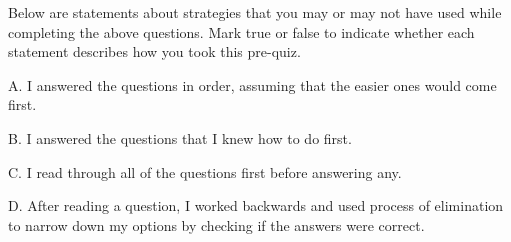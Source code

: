 \documentclass{ximera}
\begin{document}
\begin{question}

Below are statements about strategies that you may or may not have used while completing the above questions.  Mark true or false to indicate whether each statement describes how you took this pre-quiz. 

\begin{question}

    A. I answered the questions in order, assuming that the easier ones would come first.

    \begin{multipleChoice}
    \end{multipleChoice}
    
\end{question}
\begin{question}
    
    B. I answered the questions that I knew how to do first.

    \begin{multipleChoice}
    \end{multipleChoice}
    
\end{question}
\begin{question}
    
    C. I read through all of the questions first before answering any.

    \begin{multipleChoice}
    \end{multipleChoice}
    
\end{question}
\begin{question}
    
    D. After reading a question, I worked backwards and used process of elimination to narrow down my options by checking if the answers were correct.

    \begin{multipleChoice}
    \end{multipleChoice}
    
\end{question}

\begin{question}
    

\end{question}
\end{question}
\end{document}
